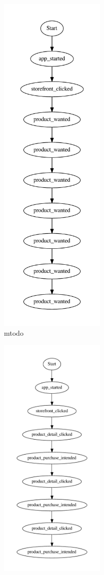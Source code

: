     \begin{figure}[H]
        \centering
        \begin{subfigure}{.33\textwidth}
            \includegraphics[width=2in]{image/403session-2-gvfile.pdf}
            \centering
            \caption{mtodo}
    \label{subfigure:statesInteractions}
        \end{subfigure}%
        \begin{subfigure}{.33\textwidth}
            \includegraphics[width=2in]{image/309session-3-gvfile.pdf}

\end{subfigure}
\end{figure}
